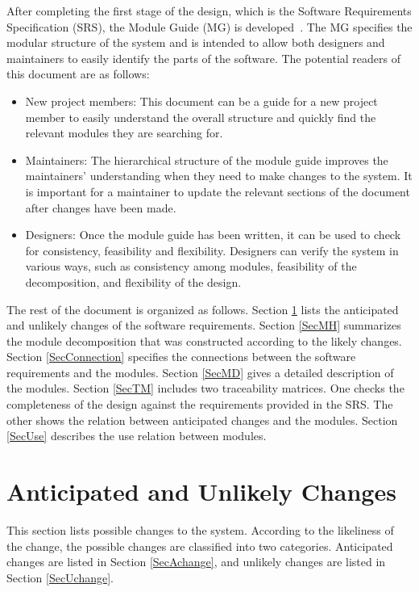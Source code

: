 \documentclass[12pt]{article}
\begin{document}
After completing the first stage of the design, which is the Software Requirements
Specification (SRS), the Module Guide (MG) is developed~\citep{ParnasEtAl1984}. 
The MG
specifies the modular structure of the system and is intended to allow both
designers and maintainers to easily identify the parts of the software.  The
potential readers of this document are as follows:

\begin{itemize}
\item New project members: This document can be a guide for a new project member
  to easily understand the overall structure and quickly find the
  relevant modules they are searching for.
\item Maintainers: The hierarchical structure of the module guide improves the
  maintainers' understanding when they need to make changes to the system. It is
  important for a maintainer to update the relevant sections of the document
  after changes have been made.
\item Designers: Once the module guide has been written, it can be used to
  check for consistency, feasibility and flexibility. Designers can verify the
  system in various ways, such as consistency among modules, feasibility of the
  decomposition, and flexibility of the design.
\end{itemize}

The rest of the document is organized as follows. Section
\ref{SecChange} lists the anticipated and unlikely changes of the software
requirements. Section \ref{SecMH} summarizes the module decomposition that
was constructed according to the likely changes. Section \ref{SecConnection}
specifies the connections between the software requirements and the
modules. Section \ref{SecMD} gives a detailed description of the
modules. Section \ref{SecTM} includes two traceability matrices. One checks
the completeness of the design against the requirements provided in the SRS. The
other shows the relation between anticipated changes and the modules. Section
\ref{SecUse} describes the use relation between modules.

\section{Anticipated and Unlikely Changes} \label{SecChange}

This section lists possible changes to the system. According to the likeliness
of the change, the possible changes are classified into two
categories. Anticipated changes are listed in Section \ref{SecAchange}, and
unlikely changes are listed in Section \ref{SecUchange}.
\end{document}
